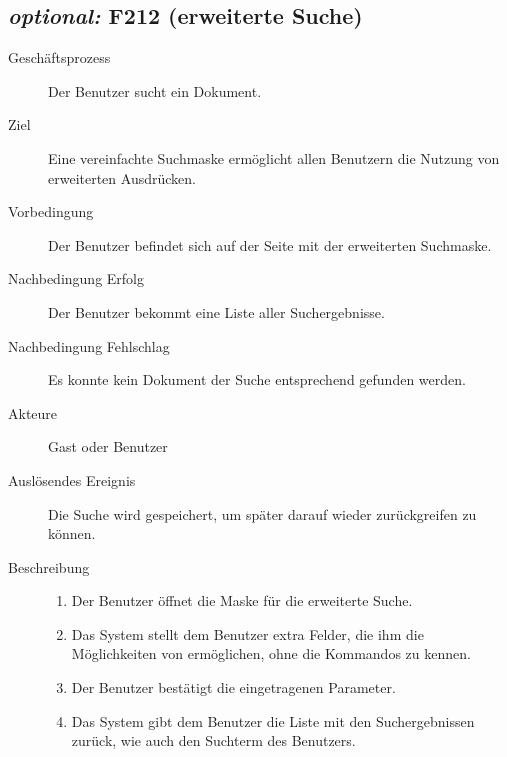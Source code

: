 \subsection{\emph{optional:} F212 (erweiterte Suche)}
\label{F:n00bSuche}
\begin{description}
  \item[Geschäftsprozess]Der Benutzer sucht ein Dokument.
  \item[Ziel]Eine vereinfachte Suchmaske ermöglicht allen Benutzern die Nutzung von erweiterten Ausdrücken.
  \item[Vorbedingung]Der Benutzer befindet sich auf der Seite mit der erweiterten Suchmaske.
  \item[Nachbedingung Erfolg]Der Benutzer bekommt eine Liste aller Suchergebnisse.
  \item[Nachbedingung Fehlschlag]Es konnte kein Dokument der Suche entsprechend gefunden werden.
  \item[Akteure]Gast oder Benutzer
  \item[Auslösendes Ereignis]Die Suche wird gespeichert, um später darauf wieder zurückgreifen zu können.
  \item[Beschreibung]\hfill
    \begin{enumerate}
      \item Der Benutzer öffnet die Maske für die erweiterte Suche.
      \item Das System stellt dem Benutzer extra Felder, die ihm die Möglichkeiten von  ermöglichen, ohne die Kommandos zu kennen.
      \item Der Benutzer bestätigt die eingetragenen Parameter.
      \item Das System gibt dem Benutzer die Liste mit den Suchergebnissen zurück, wie auch den Suchterm des Benutzers.
    \end{enumerate}
\end{description}


